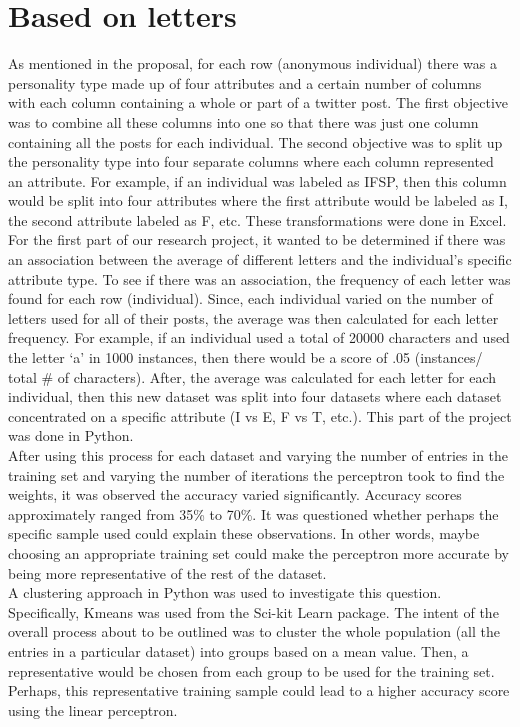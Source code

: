 \documentclass{article}
\begin{document}
\section{Based on letters}
As mentioned in the proposal, for each row (anonymous individual) there was a personality type made up of four attributes and a certain number of columns with each column containing a whole or part of a twitter post. The first objective was to combine all these columns into one so that there was just one column containing all the posts for each individual. The second objective was to split up the personality type into four separate columns where each column represented an attribute. For example, if an individual was labeled as IFSP, then this column would be split into four attributes where the first attribute would be labeled as I, the second attribute labeled as F, etc. These transformations were done in Excel.\\
For the first part of our research project, it wanted to be determined if there was an association between the average of different letters and the individual’s specific attribute type. To see if there was an association, the frequency of each letter was found for each row (individual). Since, each individual varied on the number of letters used for all of their posts, the average was then calculated for each letter frequency. For example, if an individual used a total of 20000 characters and used the letter ‘a’ in 1000 instances, then there would be a score of .05 (instances/ total \# of characters). After, the average was calculated for each letter for each individual, then this new dataset was split into four datasets where each dataset concentrated on a specific attribute (I vs E, F vs T, etc.). This part of the project was done in Python.
\\
After using this process for each dataset and varying the number of entries in the training set and varying the number of iterations the perceptron took to find the weights, it was observed the accuracy varied significantly. Accuracy scores approximately ranged from 35\% to 70\%. It was questioned whether perhaps the specific sample used could explain these observations. In other words, maybe choosing an appropriate training set could make the perceptron more accurate by being more representative of the rest of the dataset.
\\
A clustering approach in Python was used to investigate this question. Specifically, Kmeans was used from the Sci-kit Learn package. The intent of the overall process about to be outlined was to cluster the whole population (all the entries in a particular dataset) into groups based on a mean value. Then, a representative would be chosen from each group to be used for the training set. Perhaps, this representative training sample could lead to a higher accuracy score using the linear perceptron.
\end{document}

